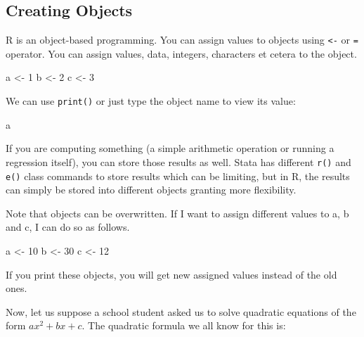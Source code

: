 \documentclass[
]{article}
\newenvironment{Shaded}{\begin{snugshade}}{\end{snugshade}}
\newcommand{\DecValTok}[1]{\textcolor[rgb]{0.00,0.00,0.81}{#1}}
\newcommand{\NormalTok}[1]{#1}
\newcommand{\OtherTok}[1]{\textcolor[rgb]{0.56,0.35,0.01}{#1}}
\begin{document}
\subsection{Creating Objects}\label{creating-objects}

R is an object-based programming. You can assign values to objects using
\texttt{\textless{}-} or \texttt{=} operator. You can assign values,
data, integers, characters et cetera to the object.

\begin{Shaded}
\begin{Highlighting}[]
\NormalTok{a }\OtherTok{\textless{}{-}} \DecValTok{1}
\NormalTok{b }\OtherTok{\textless{}{-}} \DecValTok{2}
\NormalTok{c }\OtherTok{\textless{}{-}} \DecValTok{3}
\end{Highlighting}
\end{Shaded}

We can use \texttt{print()} or just type the object name to view its
value:

\begin{Shaded}
\begin{Highlighting}[]
\NormalTok{a}
\end{Highlighting}
\end{Shaded}

If you are computing something (a simple arithmetic operation or running
a regression itself), you can store those results as well. Stata has
different \texttt{r()} and \texttt{e()} class commands to store results
which can be limiting, but in R, the results can simply be stored into
different objects granting more flexibility.

Note that objects can be overwritten. If I want to assign different
values to a, b and c, I can do so as follows.

\begin{Shaded}
\begin{Highlighting}[]
\NormalTok{a }\OtherTok{\textless{}{-}} \DecValTok{10}
\NormalTok{b }\OtherTok{\textless{}{-}} \DecValTok{30}
\NormalTok{c }\OtherTok{\textless{}{-}} \DecValTok{12}
\end{Highlighting}
\end{Shaded}

If you print these objects, you will get new assigned values instead of
the old ones.

Now, let us suppose a school student asked us to solve quadratic
equations of the form \(ax^2 + bx + c\). The quadratic formula we all
know for this is:
\end{document}
